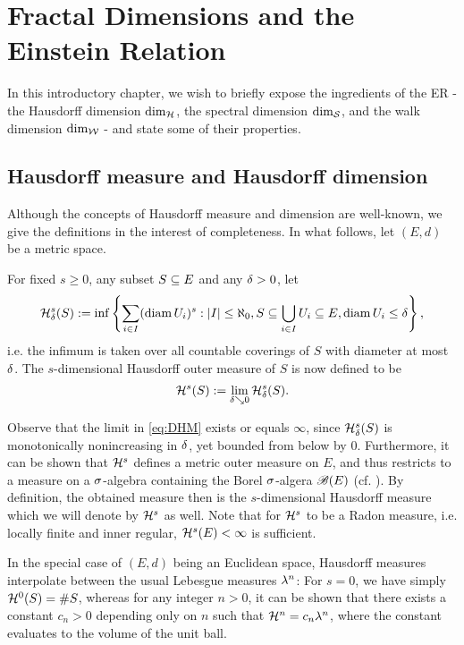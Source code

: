 \chapter{Fractal Dimensions and the Einstein Relation}

In this introductory chapter, we wish to briefly expose the ingredients of the ER - the Hausdorff dimension $\dim_{\mathcal{H}}$, the spectral dimension $\dim_{\mathcal{S}}$, and the walk dimension $\dim_{\mathcal{W}}$ - and state some of their properties. 

\section{Hausdorff measure and Hausdorff dimension}

Although the concepts of Hausdorff measure and dimension are well-known, we give the definitions in the interest of completeness. In what follows, let $(E,d)$ be a metric space.
\begin{defin}
  For fixed $s\geq0$, any subset $S\subseteq E$ and any $\delta>0$, let 
  \[
    \mathcal{H}^s_\delta(S)
      :=\inf \left\{\sum_{i\in I}(\operatorname{diam} U_i)^s:
            |I|\leq\aleph_0,S\subseteq\bigcup_{i\in I}U_i\subseteq E,\operatorname{diam} U_i\leq\delta\right\},
  \]
  i.e. the infimum is taken over all countable coverings of $S$ with diameter at most $\delta$. The $s$-dimensional Hausdorff outer measure of $S$ is now defined to be
  \begin{equation}\label{eq:DHM}
    \mathcal{H}^s(S):=\lim_{\delta\searrow0}\mathcal{H}^s_\delta(S).
  \end{equation}
\end{defin}
Observe that the limit in \eqref{eq:DHM} exists or equals $\infty$, since $\mathcal{H}^s_\delta(S)$ is monotonically nonincreasing in $\delta$, yet bounded from below by 0. Furthermore, it can be shown that $\mathcal{H}^s$ defines a metric outer measure on $E$, and thus restricts to a measure on a $\sigma$-algebra containing the Borel $\sigma$-algera $\mathscr{B}(E)$ (cf. \cite[p.54ff]{mattila1999geometry}). By definition, the obtained measure then is the $s$-dimensional Hausdorff measure which we will denote by $\mathcal{H}^s$ as well. Note that for $\mathcal{H}^s$ to be a Radon measure, i.e. locally finite and inner regular, $\mathcal{H}^s(E)<\infty$ is sufficient.

In the special case of $(E,d)$ being an Euclidean space, Hausdorff measures interpolate between the usual Lebesgue measures $\lambda^n$: For $s=0$, we have simply $\mathcal{H}^0(S)=\# S$, whereas for any integer $n>0$, it can be shown that there exists a constant $c_n>0$ depending only on $n$ such that $\mathcal{H}^n=c_n\lambda^n$, where the constant evaluates to the volume of the unit ball.

